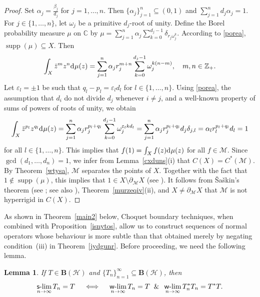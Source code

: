\documentclass[reqno]{amsproc}
\DeclareMathOperator{\supp}{supp}
\numberwithin{equation}{section}
\newtheorem{lemma}[theorem]{Lemma}
\theoremstyle{remark}
\newcommand*{\hh}{\mathcal{H}}
\newcommand*{\mcal}{\mathcal{M}}
\newcommand*{\comp}{\mathbb{C}}
\newcommand*{\cbb}{\comp}
\newcommand*{\D}{\mathrm{d\hspace{.1ex}}}
\theoremstyle{definition}
\newcommand*{\ogr}{\boldsymbol{B}}
\newcommand*{\zbb}{\mathbb{Z}}
\def\sslim{\qopname\relax m{{\sf{s}\textrm-}lim}}
\def\wwlim{\qopname\relax m{{\sf{w}\textrm-}lim}}
\begin{document}
   \begin{proof}
Set $\alpha_j=\frac{\beta_j}{d_j}$ for $j=1,\ldots,n$.
Then $\{\alpha_j\}_{j=1}^n \subseteq (0,1)$ and
$\sum_{j=1}^n d_j \alpha_j=1$. For $j\in \{1, \ldots,
n\}$, let $\omega_j$ be a primitive $d_j$-root of
unity. Define the Borel probability measure $\mu$ on
$\cbb$ by $\mu = \sum_{j=1}^n \alpha_j
\sum_{k=0}^{d_j-1} \delta_{r_j\omega_j^k}$. According
to \eqref{porea}, $\supp(\mu)\subseteq X$. Then
   \begin{align*}
\int_{X} \bar z^m z^n \D \mu(z) = \sum_{j=1}^n
\alpha_j r_j^{m+n} \sum_{k=0}^{d_j-1}
\omega_j^{k(n-m)}, \quad m,n \in \zbb_+.
   \end{align*}
Let $\varepsilon_l = \pm 1$ be such that
$q_l-p_l=\varepsilon_l d_l$ for $l\in \{1,
\ldots,n\}$. Using \eqref{porea}, the assumption that
$d_i$ do not divide $d_j$ whenever $i\neq j$, and a
well-known property of sums of powers of roots of
unity, we obtain
   \begin{align*}
\int_{X} \bar z^{p_l} z^{q_l} \D \mu(z) = \sum_{j=1}^n
\alpha_j r_j^{p_l+q_l} \sum_{k=0}^{d_j-1}
\omega_j^{\varepsilon_l k d_l} = \sum_{j=1}^n \alpha_j
r_j^{p_l+q_l} d_j \delta_{j,l} = \alpha_l
r_l^{p_l+q_l} d_l =1
   \end{align*}
for all $l \in\{1, \ldots, n\}$. This implies that
$f(1)=\int_{X} f(z) \D \mu(z)$ for all $f\in \mcal$.
Since $\gcd(d_1, \ldots, d_n)=1$, we infer from
Lemma~\ref{cxduns}(i) that $C(X)=C^*(\mcal)$. By
Theorem~\ref{wtysa}, $\mcal$ separates the points of
$X$. Together with the fact that $1 \notin
\supp(\mu)$, this implies that $1\in X \setminus
\partial_{\mcal} X$ (see \cite[Proposition~6.2]{Phe02}).
It follows from \v{S}a\v{s}kin's theorem (see
\cite{Sas67}; see also \cite[Theorem, p.\ 48]{Phe02}),
Theorem~\ref{murzeqiv}(ii), and $X \neq
\partial_\mathcal{M}X$ that $\mcal$ is not hyperrigid in $C(X)$.
   \end{proof}
As shown in Theorem~\ref{main2} below, Choquet
boundary techniques, when combined with
Proposition~\ref{isnytos}, allow us to construct
sequences of normal operators whose behaviour is more
subtle than that obtained merely by negating
condition~(iii) in Theorem~\ref{jydgunr}. Before
proceeding, we need the following lemma.
   \begin{lemma} \label{wphnw}
If $T\in \ogr(\hh)$ and
$\{T_n\}_{n=1}^{\infty}\subseteq \ogr(\hh)$,
then
   \begin{align*}
\sslim_{n\to \infty} T_n = T \quad \iff
\quad \wwlim_{n\to \infty} T_n = T \;\; \&
\;\; \wwlim_{n\to \infty} T_n^*T_n = T^*T.
   \end{align*}
   \end{lemma}
\end{document}
